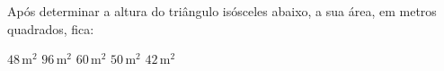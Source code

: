 Após determinar a altura do triângulo isósceles abaixo, a sua área, em metros quadrados, fica:

\parbox{0.4\linewidth}{

$48$\,m$^2$
$96$\,m$^2$
$60$\,m$^2$
$50$\,m$^2$
$42$\,m$^2$

}\parbox{0.59\linewidth}{
\begin{center}
\vspace{-6mm}
\vspace{-9mm}
\end{center}
}


